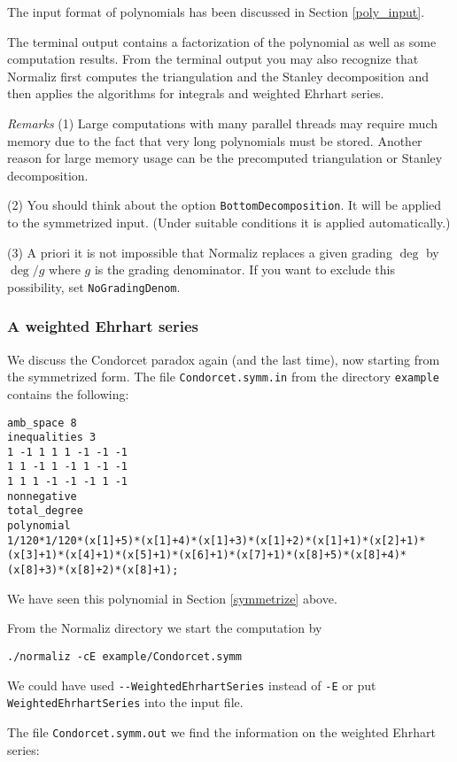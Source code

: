 \documentclass[12pt,a4paper]{scrartcl}
\theoremstyle{definition}
\def\ttt{\texttt}
\begin{document}
{The input format of polynomials has been discussed in Section \ref{poly_input}.

The terminal output contains a factorization of the polynomial as well as some computation results. From the terminal output you may also recognize that Normaliz first computes the triangulation and the Stanley decomposition and then applies the algorithms for integrals and  weighted Ehrhart series.

\emph{Remarks} \enspace (1) Large computations with many parallel threads may require much memory due to the fact that very long polynomials must be stored. Another reason for large memory usage can be the precomputed triangulation or Stanley decomposition.

(2) You should think about the option \verb|BottomDecomposition|. It will be applied to the symmetrized input. (Under suitable conditions it is applied automatically.)

(3) A priori it is not impossible that Normaliz replaces a given grading $\deg$ by $\deg/g$ where $g$ is the grading denominator. If you want to exclude this possibility, set \verb|NoGradingDenom|.
 

\subsubsection{A weighted Ehrhart series}

We discuss the Condorcet paradox again (and the last time), now starting from the symmetrized form. The file \ttt{Condorcet.symm.in} from the directory
\ttt{example} contains the following:

\begin{Verbatim}
amb_space 8
inequalities 3
1 -1 1 1 1 -1 -1 -1
1 1 -1 1 -1 1 -1 -1
1 1 1 -1 -1 -1 1 -1
nonnegative
total_degree
polynomial
1/120*1/120*(x[1]+5)*(x[1]+4)*(x[1]+3)*(x[1]+2)*(x[1]+1)*(x[2]+1)*
(x[3]+1)*(x[4]+1)*(x[5]+1)*(x[6]+1)*(x[7]+1)*(x[8]+5)*(x[8]+4)*
(x[8]+3)*(x[8]+2)*(x[8]+1);
\end{Verbatim}
We have seen this polynomial in Section \ref{symmetrize} above.


From the Normaliz directory we start the computation by
\begin{Verbatim}
./normaliz -cE example/Condorcet.symm
\end{Verbatim}
We could have used \verb|--WeightedEhrhartSeries| instead of \verb|-E| or put \verb|WeightedEhrhartSeries| into the input file.

The file \ttt{Condorcet.symm.out} we find the information on the weighted Ehrhart series:

}
\end{document}
